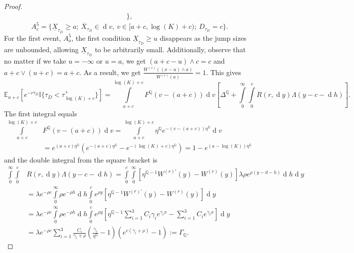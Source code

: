 \documentclass[10pt]{amsart}
\def\E{{\mathbb{E}}}
\def\Q{{\mathbb{Q}}}
\def \R{{{\rm I{\!}\rm R}}}
\def \I{{\mathbb{I}}}
\newcommand{\dx}{\operatorname{d}\!}
\def\E{{\mathbb E}} \def\PP{\mc P} \def\Z{{\mathbb Z}} \def\R{{\mathbb R}}
\begin{document}
\begin{proof}
\begin{align*}
				\},
			\end{align*}
			\begin{equation*}
				A_c^5 = \{ \underline{X}_{\tau_D} \geq a;\ \overline{X}_{\tau_D} \in \dx v,\ v \in [a+c, \log(K) +c);\  D_{\tau_D} =c \}.
			\end{equation*}
			For the first event, $A_o^5$, the first condition $\underline{X}_{\tau_D} \geq u$ disappears as the jump sizes are unbounded, allowing $\underline{X}_{\tau_D}$ to be arbitrarily small. Additionally, observe that no matter if we take $u=-\infty$ or $u=a$, we get $(a+c-u)\wedge c = c$ and $a+c \vee (u+c) = a+c$. As a result, we get $\frac{W^{(r)} ((x-u)\wedge a)}{W^{(r)}(a)} = 1$.
			This gives
			\begin{equation*}
				\E_{a+c} \left[ e^{-r\tau_D} \I \{ \tau_D < \tau_{\log(K)+c}^+ \} \right] = \int\limits_{a+c}^{\log(K)+c}F^\Q(v-(a+c))\dx v \left[ \Delta^\Q + \int\limits_{0}^{\infty}\int\limits_{0}^{c} R(r,\dx y) 	\Lambda(y-c-\dx h)  \right].
			\end{equation*}
			The first integral equals
			\begin{align*}
				\int\limits_{a+c}^{\log(K)+c}&F^\Q(v-(a+c))\dx v = \int\limits_{a+c}^{\log(K)+c} \eta^\Q e^{-(v-(a+c))\eta^\Q} \dx v \\
				\nonumber &= e^{(a+c)\eta^\Q}\left(  e^{-(a+c)\eta^\Q} - e^{-(\log(K)+c)\eta^\Q}\right) = 1 - e^{(a-\log(K))\eta^\Q}
			\end{align*}
			and the double integral from the square bracket is
			\begin{align}
				\nonumber \int\limits_{0}^{\infty}\int\limits_{0}^{c} &R(r,\dx y) 	\Lambda(y-c-\dx h) = \int\limits_{0}^{c}\int\limits_{0}^{\infty} \left[\eta^{\Q-1} W^{(r)'}(y) - W^{(r)}(y) \right] \lambda\rho e^{\rho(y-d-h)} \dx h \dx y \\
				\nonumber &= \lambda e^{-\rho c} \int\limits_{0}^{\infty} \rho e^{-\rho h} \dx h \int\limits_{0}^{c} e^{\rho y} \left[\eta^{\Q-1} W^{(r)'}(y) - W^{(r)}(y) \right] \dx y \\
				\nonumber &= \lambda e^{-\rho c} \int\limits_{0}^{\infty} \rho e^{-\rho h} \dx h \int\limits_{0}^{c} e^{\rho y} \left[\eta^{\Q-1} \sum_{i=1}^3 C_i \gamma_i e^{\gamma_i x} -\sum_{i=1}^3 C_i e^{\gamma_i x} \right] \dx y \\
				&= \lambda e^{-\rho c} \sum_{i=1}^3 \frac{C_i}{\gamma_i + \rho} \left( \frac{\gamma_i}{\eta^\Q}-1\right)\left(e^{c(\gamma_i+\rho)}-1\right) := \Gamma_\Q. \label{deriveGamma}
			\end{align}

\end{proof}
\end{document}
